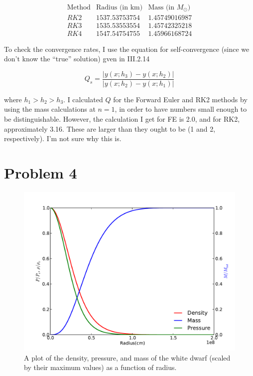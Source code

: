 \documentclass[11pt,letterpaper]{article}
\begin{document}
\[
\begin{array}{ccc}
\text{Method} & \text{Radius (in km)} & \text{Mass (in $M_{\odot}$)} \\
RK2 & 1537.53753754 & 1.45749016987 \\
RK3 & 1535.53553554 & 1.45742325218 \\
RK4 & 1547.54754755 & 1.45966168724
\end{array}
\]

To check the convergence rates, I use the equation for self-convergence (since
we don't know the ``true'' solution) gven in III.2.14

$$ Q_s = \frac{|y(x;h_3) - y(x;h_2)|}{|y(x;h_2) - y(x;h_1)|} $$

where $h_1 > h_2 > h_3$. I calculated $Q$ for the Forward Euler and RK2 methods by using the mass calculations at $n=1$, in order to have numbers small enough to be distinguishable. However, the calculation I get for FE is 2.0, and for RK2, approximately 3.16. These are larger than they ought to be (1 and 2, respectively). I'm not sure why this is.

\section*{Problem 4}

\begin{figure}[!htb]\centering
  \includegraphics[width=1\textwidth]{WhiteDwarf}
  \caption{A plot of the density, pressure, and mass of the white dwarf (scaled by their maximum values) as a function of radius.}
  \end{figure}
\end{document}
